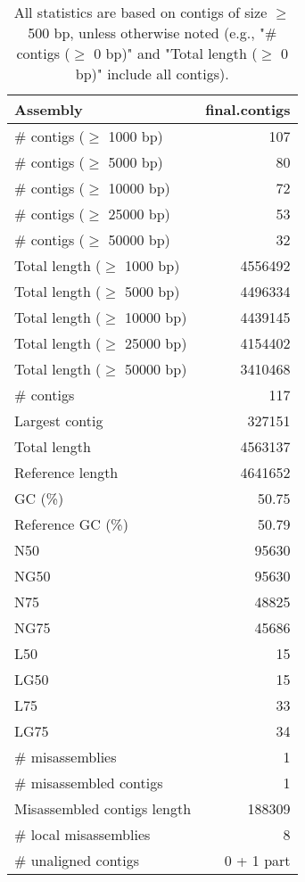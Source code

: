 \documentclass[12pt,a4paper]{article}
\begin{document}
\begin{table}[ht]
\begin{center}
\caption{All statistics are based on contigs of size $\geq$ 500 bp, unless otherwise noted (e.g., "\# contigs ($\geq$ 0 bp)" and "Total length ($\geq$ 0 bp)" include all contigs).}
\begin{tabular}{|l*{1}{|r}|}
\hline
Assembly & final.contigs \\ \hline
\# contigs ($\geq$ 1000 bp) & 107 \\ \hline
\# contigs ($\geq$ 5000 bp) & 80 \\ \hline
\# contigs ($\geq$ 10000 bp) & 72 \\ \hline
\# contigs ($\geq$ 25000 bp) & 53 \\ \hline
\# contigs ($\geq$ 50000 bp) & 32 \\ \hline
Total length ($\geq$ 1000 bp) & 4556492 \\ \hline
Total length ($\geq$ 5000 bp) & 4496334 \\ \hline
Total length ($\geq$ 10000 bp) & 4439145 \\ \hline
Total length ($\geq$ 25000 bp) & 4154402 \\ \hline
Total length ($\geq$ 50000 bp) & 3410468 \\ \hline
\# contigs & 117 \\ \hline
Largest contig & 327151 \\ \hline
Total length & 4563137 \\ \hline
Reference length & 4641652 \\ \hline
GC (\%) & 50.75 \\ \hline
Reference GC (\%) & 50.79 \\ \hline
N50 & 95630 \\ \hline
NG50 & 95630 \\ \hline
N75 & 48825 \\ \hline
NG75 & 45686 \\ \hline
L50 & 15 \\ \hline
LG50 & 15 \\ \hline
L75 & 33 \\ \hline
LG75 & 34 \\ \hline
\# misassemblies & 1 \\ \hline
\# misassembled contigs & 1 \\ \hline
Misassembled contigs length & 188309 \\ \hline
\# local misassemblies & 8 \\ \hline
\# unaligned contigs & 0 + 1 part \\ \hline

\end{tabular}
\end{center}
\end{table}
\end{document}
